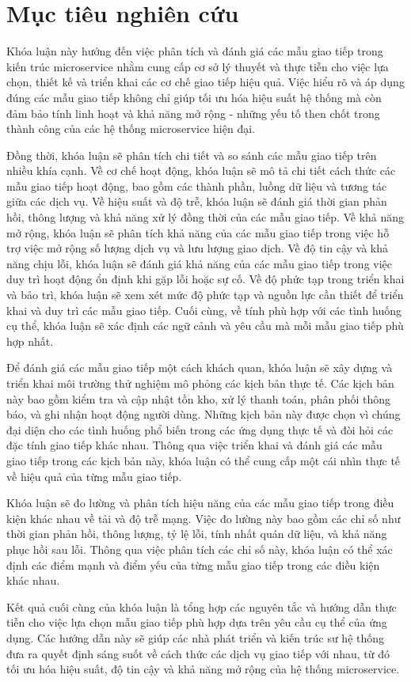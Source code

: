 \section{Mục tiêu nghiên cứu}
Khóa luận này hướng đến việc phân tích và đánh giá các mẫu giao tiếp trong kiến
trúc microservice nhằm cung cấp cơ sở lý thuyết và thực tiễn cho việc lựa chọn,
thiết kế và triển khai các cơ chế giao tiếp hiệu quả. Việc hiểu rõ và áp dụng
đúng các mẫu giao tiếp không chỉ giúp tối ưu hóa hiệu suất hệ thống mà còn đảm
bảo tính linh hoạt và khả năng mở rộng - những yếu tố then chốt trong thành
công của các hệ thống microservice hiện đại.

Đồng thời, khóa luận sẽ phân tích chi tiết và so sánh các mẫu giao tiếp trên nhiều khía cạnh. Về cơ chế hoạt động, khóa luận sẽ mô tả chi tiết cách thức các mẫu giao tiếp hoạt động, bao gồm các thành phần, luồng dữ liệu và tương tác giữa các dịch vụ. Về hiệu suất và độ trễ, khóa luận sẽ đánh giá thời gian phản hồi, thông lượng và khả năng xử lý đồng thời của các mẫu giao tiếp. Về khả năng mở rộng, khóa luận sẽ phân tích khả năng của các mẫu giao tiếp trong việc hỗ trợ việc mở rộng số lượng dịch vụ và lưu lượng giao dịch. Về độ tin cậy và khả năng chịu lỗi, khóa luận sẽ đánh giá khả năng của các mẫu giao tiếp trong việc duy trì hoạt động ổn định khi gặp lỗi hoặc sự cố. Về độ phức tạp trong triển khai và bảo trì, khóa luận sẽ xem xét mức độ phức tạp và nguồn lực cần thiết để triển khai và duy trì các mẫu giao tiếp. Cuối cùng, về tính phù hợp với các tình huống cụ thể, khóa luận sẽ xác định các ngữ cảnh và yêu cầu mà mỗi mẫu giao tiếp phù hợp nhất.

Để đánh giá các mẫu giao tiếp một cách khách quan, khóa luận sẽ xây dựng và triển khai môi trường thử nghiệm mô phỏng các kịch bản thực tế. Các kịch bản này bao gồm kiểm tra và cập nhật tồn kho, xử lý thanh toán, phân phối thông báo, và ghi nhận hoạt động người dùng. Những kịch bản này được chọn vì chúng đại diện cho các tình huống phổ biến trong các ứng dụng thực tế và đòi hỏi các đặc tính giao tiếp khác nhau. Thông qua việc triển khai và đánh giá các mẫu giao tiếp trong các kịch bản này, khóa luận có thể cung cấp một cái nhìn thực tế về hiệu quả của từng mẫu giao tiếp.

Khóa luận sẽ đo lường và phân tích hiệu năng của các mẫu giao tiếp trong điều
kiện khác nhau về tải và độ trễ mạng. Việc đo lường này bao gồm các chỉ số như
thời gian phản hồi, thông lượng, tỷ lệ lỗi, tính nhất quán dữ liệu, và khả năng
phục hồi sau lỗi. Thông qua việc phân tích các chỉ số này, khóa luận có thể xác
định các điểm mạnh và điểm yếu của từng mẫu giao tiếp trong các điều kiện khác
nhau.

Kết quả cuối cùng của khóa luận là tổng hợp các nguyên tắc và hướng dẫn thực
tiễn cho việc lựa chọn mẫu giao tiếp phù hợp dựa trên yêu cầu cụ thể của ứng
dụng. Các hướng dẫn này sẽ giúp các nhà phát triển và kiến trúc sư hệ thống đưa
ra quyết định sáng suốt về cách thức các dịch vụ giao tiếp với nhau, từ đó tối
ưu hóa hiệu suất, độ tin cậy và khả năng mở rộng của hệ thống microservice.